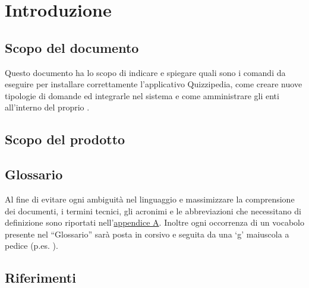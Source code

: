 \documentclass[a4paper, titlepage]{article}
\begin{document}
	
	\pagestyle{fancy}	
	
	\maketitle
	
	
	
	\newpage
	\tableofcontents\label{lastromanpage}
	
	\newpage
	\clearpage	
	\hypersetup{linkcolor=blue}
	
	\section{Introduzione}
	\subsection{Scopo del documento}
	Questo documento ha lo scopo di indicare e spiegare quali sono i comandi da eseguire per installare correttamente l'applicativo Quizzipedia, come creare nuove tipologie di domande ed integrarle nel sistema e come amministrare gli enti all'interno del proprio .
	
	\subsection{Scopo del prodotto}
	\SCOPO
	
	\subsection{Glossario}
	Al fine di evitare ogni ambiguità nel linguaggio e massimizzare la comprensione dei documenti, i termini tecnici, gli acronimi e le abbreviazioni che necessitano di definizione sono riportati nell'\hyperref[gl]{appendice A}.
	Inoltre ogni occorrenza di un vocabolo presente nel “Glossario” sarà posta in corsivo e seguita da
	una ‘g’ maiuscola a pedice (p.es. ).
		
	\subsection{Riferimenti}	
\end{document}
